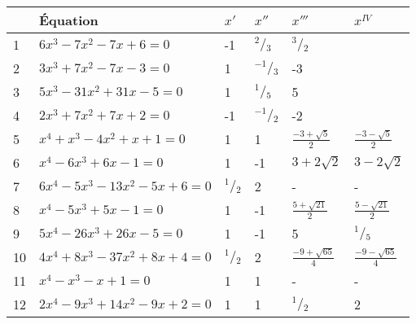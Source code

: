 \begin{landscape}
\begin{solution}
\begin{tabular}{|l|l|l|l|l|l|}
\hline
   & Équation                                   & ${x}'$          & ${x}''$          & ${x}'''$                 & ${{x}^{IV}}$             \\ \hline
1  & $6x{}^{3}-7{{x}^{2}}-7x+6=0$               & -1              & ${}^{2}/{}_{3}$  & ${}^{3}/{}_{2}$          &                          \\ \hline
2  & $3{{x}^{3}}+7{{x}^{2}}-7x-3=0$             & 1               & ${}^{-1}/{}_{3}$ & -3                       &                          \\ \hline
3  & $5{{x}^{3}}-31{{x}^{2}}+31x-5=0$           & 1               & ${}^{1}/{}_{5}$  & 5                        &                          \\ \hline
4  & $2{{x}^{3}}+7{{x}^{2}}+7x+2=0$             & -1              & ${}^{-1}/{}_{2}$ & -2                       &                          \\ \hline
5  & ${{x}^{4}}+{{x}^{3}}-4{{x}^{2}}+x+1=0$     & 1               & 1                & $\frac{-3+\sqrt{5}}{2}$  & $\frac{-3-\sqrt{5}}{2}$  \\ \hline
6  & ${{x}^{4}}-6{{x}^{3}}+6x-1=0$              & 1               & -1               & $3+2\sqrt{2}$            & $3-2\sqrt{2}$            \\ \hline
7  & $6{{x}^{4}}-5{{x}^{3}}-13{{x}^{2}}-5x+6=0$ & ${}^{1}/{}_{2}$ & 2                & -                        & -                        \\ \hline
8  & ${{x}^{4}}-5{{x}^{3}}+5x-1=0$              & 1               & -1               & $\frac{5+\sqrt{21}}{2}$  & $\frac{5-\sqrt{21}}{2}$  \\ \hline
9  & $5{{x}^{4}}-26{{x}^{3}}+26x-5=0$           & 1               & -1               & 5                        & ${}^{1}/{}_{5}$          \\ \hline
10 & $4{{x}^{4}}+8{{x}^{3}}-37{{x}^{2}}+8x+4=0$ & ${}^{1}/{}_{2}$ & 2                & $\frac{-9+\sqrt{65}}{4}$ & $\frac{-9-\sqrt{65}}{4}$ \\ \hline
11 & ${{x}^{4}}-{{x}^{3}}-x+1=0$                & 1               & 1                & -                        & -                        \\ \hline
12 & $2{{x}^{4}}-9{{x}^{3}}+14{{x}^{2}}-9x+2=0$ & 1               & 1                & ${}^{1}/{}_{2}$          & 2                        \\ \hline
\end{tabular}
\end{solution}


\end{landscape}
